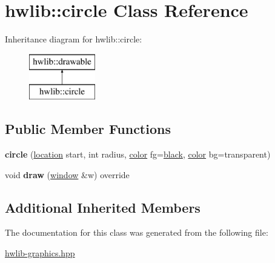 \hypertarget{classhwlib_1_1circle}{}\section{hwlib\+:\+:circle Class Reference}
\label{classhwlib_1_1circle}
Inheritance diagram for hwlib\+:\+:circle\+:\begin{figure}[H]
\begin{center}
\leavevmode
\includegraphics[height=2.000000cm]{classhwlib_1_1circle}
\end{center}
\end{figure}
\subsection*{Public Member Functions}
\begin{DoxyCompactItemize}
\item 
{\bfseries circle} (\hyperlink{classhwlib_1_1location}{location} start, int radius, \hyperlink{classhwlib_1_1color}{color} fg=\hyperlink{namespacehwlib_aa9c056fa29bc9af9f55d4b774bb3898a}{black}, \hyperlink{classhwlib_1_1color}{color} bg=transparent)\hypertarget{classhwlib_1_1circle_a072f40759c3083ea2bf1d3b6b7bb91f4}{}\label{classhwlib_1_1circle_a072f40759c3083ea2bf1d3b6b7bb91f4}

\item 
void {\bfseries draw} (\hyperlink{classhwlib_1_1window}{window} \&w) override\hypertarget{classhwlib_1_1circle_a7a4d6bbd0692b757eee4615a8c5ea9f4}{}\label{classhwlib_1_1circle_a7a4d6bbd0692b757eee4615a8c5ea9f4}

\end{DoxyCompactItemize}
\subsection*{Additional Inherited Members}


The documentation for this class was generated from the following file\+:\begin{DoxyCompactItemize}
\item 
\hyperlink{hwlib-graphics_8hpp}{hwlib-\/graphics.\+hpp}\end{DoxyCompactItemize}
